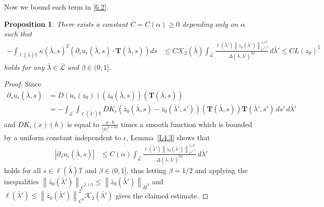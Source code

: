 \documentclass[reqno,centertags,12pt]{amsart}
\newtheorem{proposition}[theorem]{Proposition}
\theoremstyle{definition}
\numberwithin{equation}{section}
\newcommand{\abs}[1]{\left\lvert#1\right\rvert}
\newcommand{\norm}[1]{\left\|#1\right\|}
\newcommand{\bbT}{{\mathbb{T}}}
\begin{document}
Now we bound each term in \eqref{6.2}.

\begin{proposition}\label{P6.8}
    There exists a constant $C=C(\alpha)\geq 0$ depending only on $\alpha$ such that
    \begin{align*}
        -\int_{\ell(\bar{\lambda})\bbT}
        \kappa(\bar{\lambda},s)^{2}
        \left(
            \partial_{s}u_{\epsilon}(\bar{\lambda},s)
            \cdot \mathbf{T}(\bar{\lambda},s)
        \right)
        ds
        &\leq
        C\mathcal{K}_{2}(\bar{\lambda})
        \int_{\bar{\mathcal{L}}}
        \frac{\ell(\bar{\lambda}')
        \norm{\bar{z}_{0}(\bar{\lambda}')}_{\dot{C}^{1,\beta}}^{1/\beta}}
        {\Delta(\bar{\lambda},\bar{\lambda}')^{2\alpha}}
        \,d\bar{\lambda}'
        \leq CL(z_{0})^{5}
    \end{align*}
    holds for any $\bar{\lambda}\in\bar{\mathcal{L}}$ and $\beta\in(0,1]$.
\end{proposition}

\begin{proof}
    Since
    \begin{align*}
        \partial_{s}u_{\epsilon}(\bar{\lambda},s)
        &= D(u_{\epsilon}(z_{0}))(\bar{z}_{0}(\bar{\lambda},s))
        (\mathbf{T}(\bar{\lambda},s)) \\
        &= -\int_{\bar{\mathcal{L}}}\int_{\ell(\bar{\lambda}')\bbT}
        DK_{\epsilon}(\bar{z}_{0}(\bar{\lambda},s) - \bar{z}_{0}(\bar{\lambda}',s'))
        (\mathbf{T}(\bar{\lambda},s))
        \mathbf{T}(\bar{\lambda}',s')\,ds'\,d\bar{\lambda}'
    \end{align*}
    and $DK_{\epsilon}(x)(h)$ is equal to $\frac{x\cdot h}{\abs{x}^{2+2\alpha}}$
    times a smooth function which is bounded by a uniform constant independent to $\epsilon$,
    Lemma~\ref{L4.3} shows that
    \begin{align*}
        \abs{\partial_{s}u_{\epsilon}(\bar{\lambda},s)}
        &\leq C(\alpha)\int_{\bar{\mathcal{L}}}
        \frac{\ell(\bar{\lambda}')
        \norm{\bar{z}_{0}(\bar{\lambda}')}_{\dot{C}^{1,\beta}}^{1/\beta}}
        {\Delta(\bar{\lambda},\bar{\lambda}')^{2\alpha}}
        \,d\bar{\lambda}'
    \end{align*}
    holds for all $s\in\ell(\bar{\lambda})\bbT$ and $\beta\in(0,1]$, thus
    letting $\beta=1/2$ and applying the inequalities
    $\norm{\bar{z}_{0}(\bar{\lambda}')}_{\dot{C}^{1,1/2}}
    \leq \norm{\bar{z}_{0}(\bar{\lambda}')}_{\dot{H}^{2}}$ and
    $\ell(\bar{\lambda}') \leq \norm{\bar{z}_{0}(\bar{\lambda}')}_{C^{0}}^{2}
    \mathcal{K}_{2}(\bar{\lambda}')$ gives the claimed estimate.
\end{proof}
\end{document}
